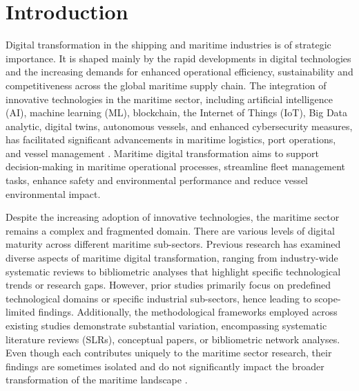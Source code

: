 \documentclass[jmse,review,submit,pdftex,moreauthors]{Definitions/mdpi}
\begin{document}

\section{Introduction}

Digital transformation in the shipping and maritime industries is of strategic importance. It is shaped mainly by the rapid developments in digital technologies and the increasing demands for enhanced operational efficiency, sustainability and competitiveness across the global maritime supply chain. The integration of innovative technologies in the maritime sector, including artificial intelligence (AI), machine learning (ML), blockchain, the Internet of Things (IoT), Big Data analytic, digital twins, autonomous vessels, and enhanced cybersecurity measures, has facilitated significant advancements in maritime logistics, port operations, and vessel management \citep{tijan2021digital,an2024maritime}. Maritime digital transformation aims to support decision-making in maritime operational processes, streamline fleet management tasks, enhance safety and environmental performance and reduce vessel environmental impact.

Despite the increasing adoption of innovative technologies, the maritime sector remains a complex and fragmented domain. There are various levels of digital maturity across different maritime sub-sectors. Previous research has examined diverse aspects of maritime digital transformation, ranging from industry-wide systematic reviews to bibliometric analyses that highlight specific technological trends or research gaps. However, prior studies primarily focus on predefined technological domains or specific industrial sub-sectors, hence leading to scope-limited findings. Additionally, the methodological frameworks employed across existing studies demonstrate substantial variation, encompassing systematic literature reviews (SLRs), conceptual papers, or bibliometric network analyses. Even though each contributes uniquely to the maritime sector research, their findings are sometimes isolated and do not significantly impact the broader transformation of the maritime landscape \citep{lau2024maritime,ouguz2024studies}. 
\end{document}
